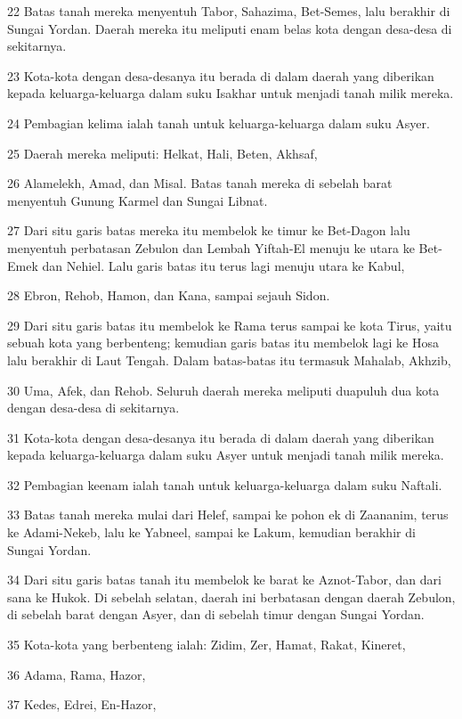 \par 22 Batas tanah mereka menyentuh Tabor, Sahazima, Bet-Semes, lalu berakhir di Sungai Yordan. Daerah mereka itu meliputi enam belas kota dengan desa-desa di sekitarnya.
\par 23 Kota-kota dengan desa-desanya itu berada di dalam daerah yang diberikan kepada keluarga-keluarga dalam suku Isakhar untuk menjadi tanah milik mereka.
\par 24 Pembagian kelima ialah tanah untuk keluarga-keluarga dalam suku Asyer.
\par 25 Daerah mereka meliputi: Helkat, Hali, Beten, Akhsaf,
\par 26 Alamelekh, Amad, dan Misal. Batas tanah mereka di sebelah barat menyentuh Gunung Karmel dan Sungai Libnat.
\par 27 Dari situ garis batas mereka itu membelok ke timur ke Bet-Dagon lalu menyentuh perbatasan Zebulon dan Lembah Yiftah-El menuju ke utara ke Bet-Emek dan Nehiel. Lalu garis batas itu terus lagi menuju utara ke Kabul,
\par 28 Ebron, Rehob, Hamon, dan Kana, sampai sejauh Sidon.
\par 29 Dari situ garis batas itu membelok ke Rama terus sampai ke kota Tirus, yaitu sebuah kota yang berbenteng; kemudian garis batas itu membelok lagi ke Hosa lalu berakhir di Laut Tengah. Dalam batas-batas itu termasuk Mahalab, Akhzib,
\par 30 Uma, Afek, dan Rehob. Seluruh daerah mereka meliputi duapuluh dua kota dengan desa-desa di sekitarnya.
\par 31 Kota-kota dengan desa-desanya itu berada di dalam daerah yang diberikan kepada keluarga-keluarga dalam suku Asyer untuk menjadi tanah milik mereka.
\par 32 Pembagian keenam ialah tanah untuk keluarga-keluarga dalam suku Naftali.
\par 33 Batas tanah mereka mulai dari Helef, sampai ke pohon ek di Zaananim, terus ke Adami-Nekeb, lalu ke Yabneel, sampai ke Lakum, kemudian berakhir di Sungai Yordan.
\par 34 Dari situ garis batas tanah itu membelok ke barat ke Aznot-Tabor, dan dari sana ke Hukok. Di sebelah selatan, daerah ini berbatasan dengan daerah Zebulon, di sebelah barat dengan Asyer, dan di sebelah timur dengan Sungai Yordan.
\par 35 Kota-kota yang berbenteng ialah: Zidim, Zer, Hamat, Rakat, Kineret,
\par 36 Adama, Rama, Hazor,
\par 37 Kedes, Edrei, En-Hazor,

